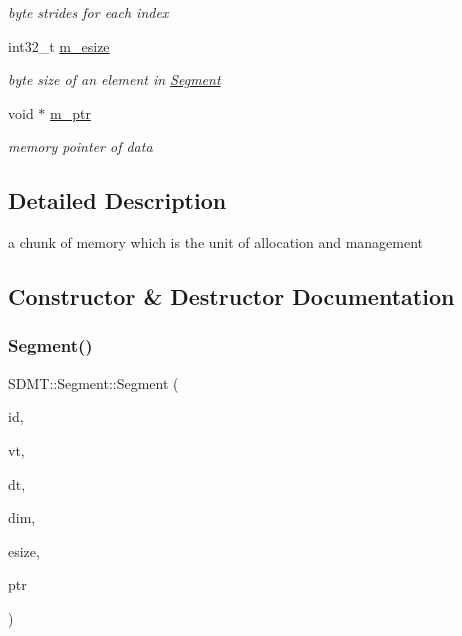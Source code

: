 \begin{DoxyCompactItemize}
\begin{DoxyCompactList}\small\item\em byte strides for each index \end{DoxyCompactList}\item 
\mbox{\label{struct_s_d_m_t_1_1_segment_abf1844991a9c39778c83fb90bdc95da7}} 
int32\+\_\+t \hyperlink{struct_s_d_m_t_1_1_segment_abf1844991a9c39778c83fb90bdc95da7}{m\+\_\+esize}
\begin{DoxyCompactList}\small\item\em byte size of an element in \hyperlink{struct_s_d_m_t_1_1_segment}{Segment} \end{DoxyCompactList}\item 
\mbox{\label{struct_s_d_m_t_1_1_segment_ad07915cd3d0e07df6338cec28ad077d8}} 
void $\ast$ \hyperlink{struct_s_d_m_t_1_1_segment_ad07915cd3d0e07df6338cec28ad077d8}{m\+\_\+ptr}
\begin{DoxyCompactList}\small\item\em memory pointer of data \end{DoxyCompactList}\end{DoxyCompactItemize}


\subsection{Detailed Description}
a chunk of memory which is the unit of allocation and management 

\subsection{Constructor \& Destructor Documentation}
\mbox{\label{struct_s_d_m_t_1_1_segment_a386954456945a0bfb2634e6e3ae2b6a6}} 
\subsubsection{\texorpdfstring{Segment()}{Segment()}\hspace{0.1cm}{\footnotesize\ttfamily [1/2]}}
{\footnotesize\ttfamily S\+D\+M\+T\+::\+Segment\+::\+Segment (\begin{DoxyParamCaption}\item[{int32\+\_\+t}]{id,  }\item[{S\+D\+M\+T\+\_\+\+VT}]{vt,  }\item[{S\+D\+M\+T\+\_\+\+DT}]{dt,  }\item[{std\+::vector$<$ int $>$}]{dim,  }\item[{int32\+\_\+t}]{esize,  }\item[{void $\ast$}]{ptr }\end{DoxyParamCaption})\hspace{0.3cm}{\ttfamily [inline]}}



